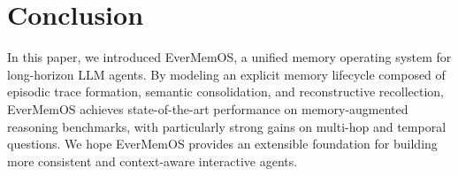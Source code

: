 \section{Conclusion}

In this paper, we introduced EverMemOS, a unified memory operating system for long-horizon LLM agents. By modeling an explicit memory lifecycle composed of episodic trace formation, semantic consolidation, and reconstructive recollection, EverMemOS achieves state-of-the-art performance on memory-augmented reasoning benchmarks, with particularly strong gains on multi-hop and temporal questions. We hope EverMemOS provides an extensible foundation for building more consistent and context-aware interactive agents.